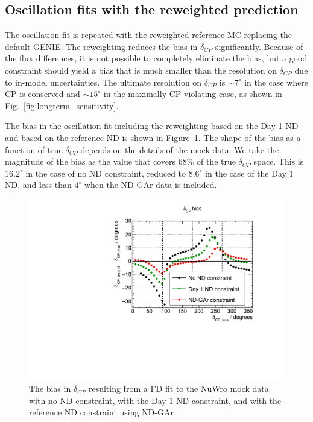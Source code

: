 \documentclass[11pt]{article}
\begin{document}
\subsection{Oscillation fits with the reweighted prediction}

The oscillation fit is repeated with the reweighted reference MC replacing the default GENIE. The reweighting reduces the bias in $\delta_{CP}$ significantly. Because of the flux differences, it is not possible to completely eliminate the bias, but a good constraint should yield a bias that is much smaller than the resolution on $\delta_{CP}$ due to in-model uncertainties. The ultimate resolution on $\delta_{CP}$ is $\sim 7^{\circ}$ in the case where CP is conserved and $\sim 15^{\circ}$ in the maximally CP violating case, as shown in Fig.~\ref{fig:longterm_sensitivity}. 

The bias in the oscillation fit including the reweighting based on the Day 1 ND and based on the reference ND is shown in Figure~\ref{fig:biasresults}. The shape of the bias as a function of true $\delta_{CP}$ depends on the details of the mock data. We take the magnitude of the bias as the value that covers 68\% of the true $\delta_{CP}$ space. This is $16.2^{\circ}$ in the case of no ND constraint, reduced to $8.6^{\circ}$ in the case of the Day 1 ND, and less than $4^{\circ}$ when the ND-GAr data is included.

\begin{figure}[h]
\centering
\includegraphics[width=0.9\columnwidth]{graphics/PiStudyBiasWithGAr.pdf}
\caption{The bias in $\delta_{CP}$ resulting from a FD fit to the NuWro mock data with no ND constraint, with the Day 1 ND constraint, and with the reference ND constraint using ND-GAr.}
\label{fig:biasresults}
\end{figure}
\end{document}
